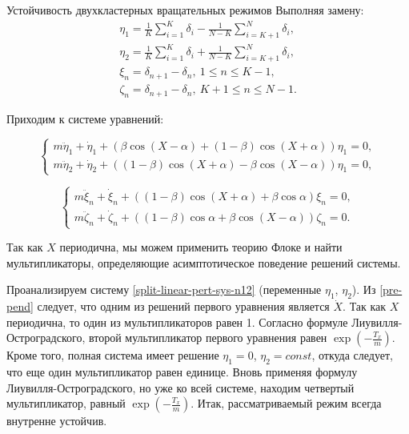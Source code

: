 \begin{chapter}{Устойчивость двухкластерных вращательных режимов}
	Выполняя замену:
	\begin{align*}
		\eta_1 = \frac{1}{K} \sum_{i = 1}^K \delta_i - \frac{1}{N - K} \sum_{i = K + 1}^N \delta_i, \\
		\eta_2 = \frac{1}{K} \sum_{i = 1}^K \delta_i + \frac{1}{N - K} \sum_{i = K + 1}^N \delta_i, \\
		\xi_n = \delta_{n+1} - \delta_n, \ 1 \leq  n \leq K - 1, \\
		\zeta_n = \delta_{n+1} - \delta_n, \ K + 1 \leq n \leq N - 1.
	\end{align*}
		
	Приходим к системе уравнений:
	
	\begin{equation} \label{split-linear-pert-sys-n12}
		\begin{cases}
			m\ddot{\eta}_1 + \dot{\eta}_1 + \left( \beta \cos{(X - \alpha)} + (1 - \beta) \cos{(X + \alpha)} \right) \eta_1 = 0, \\
			m\ddot{\eta}_2 + \dot{\eta}_2 + \left( (1 - \beta) \cos{(X + \alpha)} - \beta \cos{(X - \alpha)} \right) \eta_1 = 0,
		\end{cases}
	\end{equation}
	
	
	\begin{equation} \label{split-linear-pert-sys-ksi-eta}
		\begin{cases}
			m\ddot{\xi}_n + \dot{\xi}_n + \left( (1 - \beta) \cos{(X + \alpha)} + \beta \cos{\alpha} \right) \xi_n = 0, \\
			m\ddot{\zeta}_n + \dot{\zeta}_n + \left( (1 - \beta) \cos{\alpha} + \beta \cos{(X - \alpha)} \right) \zeta_n = 0.
		\end{cases}
	\end{equation}
	
	Так как $X$ периодична, мы можем применить теорию Флоке
	и найти мультипликаторы, определяющие асимптотическое поведение решений системы.
	
	Проанализируем систему \ref{split-linear-pert-sys-n12} (переменные $\eta_1$, $\eta_2$).
	Из \ref{pre-pend} следует, что одним из
	решений первого уравнения является $\dot{X}$.
	Так как $X$ периодична, то один из мультипликаторов равен 1.
	Согласно формуле Лиувилля-Остроградского, второй мультипликатор первого уравнения равен $\exp{(-\frac{T_x}{m})}$.
	Кроме того, полная система имеет решение $\eta_1 = 0$, $\eta_2 = const$,
	откуда следует, что еще один мультипликатор равен единице.
	Вновь применяя формулу Лиувилля-Остроградского, но
	уже ко всей системе, находим четвертый мультипликатор,
	равный $\exp{(-\frac{T_x}{m})}$. 
	Итак, рассматриваемый режим всегда внутренне устойчив.


\end{chapter}
